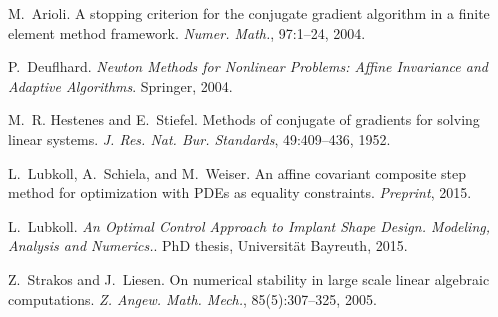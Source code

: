 
\begin{DoxyDescription}
\item[\label{_CITEREF_Arioli2004}%
\mbox{[}1\mbox{]}]M.~Arioli. A stopping criterion for the conjugate gradient algorithm in a finite element method framework. {\itshape Numer. Math.}, 97\+:1--24, 2004. 


\item[\label{_CITEREF_Deuflhard2004}%
\mbox{[}2\mbox{]}]P.~Deuflhard. {\itshape Newton Methods for Nonlinear Problems\+: Affine Invariance and Adaptive Algorithms}. Springer, 2004.


\item[\label{_CITEREF_Hestenes1952}%
\mbox{[}3\mbox{]}]M.~R. Hestenes and E.~Stiefel. Methods of conjugate of gradients for solving linear systems. {\itshape J. Res. Nat. Bur. Standards}, 49\+:409--436, 1952.


\item[\label{_CITEREF_Lubkoll2015a}%
\mbox{[}4\mbox{]}]L.~Lubkoll, A.~Schiela, and M.~Weiser. An affine covariant composite step method for optimization with P\+D\+Es as equality constraints. {\itshape Preprint}, 2015.


\item[\label{_CITEREF_Lubkoll2015}%
\mbox{[}5\mbox{]}]L.~Lubkoll. {\itshape An Optimal Control Approach to Implant Shape Design. Modeling, Analysis and Numerics.}. Ph\+D thesis, Universit\"{a}t Bayreuth, 2015.


\item[\label{_CITEREF_Strakos2005}%
\mbox{[}6\mbox{]}]Z.~Strakos and J.~Liesen. On numerical stability in large scale linear algebraic computations. {\itshape Z. Angew. Math. Mech.}, 85(5)\+:307--325, 2005. 


\end{DoxyDescription}